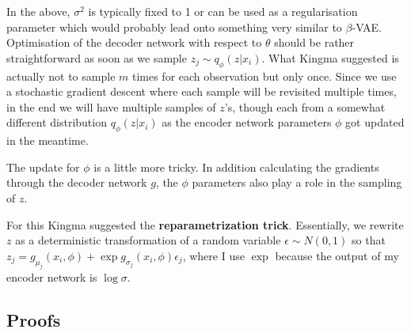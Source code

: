 In the above, $\sigma^2$ is typically fixed to 1 or can be used as a regularisation parameter which would probably lead onto something very similar to $\beta$-VAE. 
Optimisation of the decoder network with respect to $\theta$ should be rather straightforward as soon as we sample $z_j \sim q_{\phi}(z|x_i)$. 
What Kingma suggested is actually not to sample $m$ times for each observation but only once.
Since we use a stochastic gradient descent where each sample will be revisited multiple times, in the end we will have multiple samples of $z$'s, though each from a somewhat different distribution $q_{\phi}(z|x_i)$ as the encoder network parameters $\phi$ got updated in the meantime.

The update for $\phi$ is a little more tricky. In addition calculating the gradients through the decoder network $g$, the $\phi$ parameters also play a role in the sampling of $z$. 

For this Kingma suggested the \textbf{reparametrization trick}.
Essentially, we rewrite $z$ as a deterministic transformation of a random variable $\epsilon \sim N(0,1)$ so that $z_j = g_{\mu_j}(x_i,\phi) + \exp g_{\sigma_j}(x_i,\phi) \epsilon_j$, where I use $\exp$ because the output of my encoder network is $\log \sigma$.










\subsection{Proofs}\label{sec:Vae_proofs}

